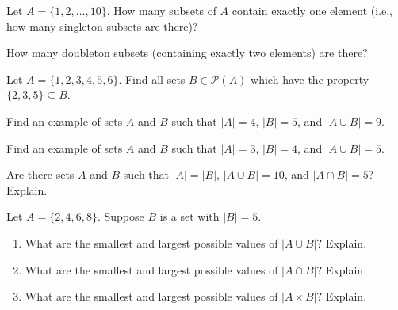\documentclass[11pt,]{book}
\theoremstyle{ptxplainnotitle}
\theoremstyle{ptxplaintitle}
\theoremstyle{ptxdefinitionnotitle}
\theoremstyle{ptxdefinitiontitle}
\theoremstyle{ptxdefinitionnotitle}
\theoremstyle{ptxdefinitiontitle}
\theoremstyle{ptxdefinitionnotitle}
\theoremstyle{ptxdefinitiontitle}
\theoremstyle{ptxdefinitiontitlenonumber}
\theoremstyle{ptxdefinitiontitlenonumber}
\numberwithin{equation}{chapter}
\newcommand{\pow}{\mathcal P}
\begin{document}
\begin{divisionexercise}{18}\hypertarget{exercise-96}{}
\hypertarget{p-947}{}%
Let \(A = \{1,2,\ldots, 10\}\text{.}\) How many subsets of \(A\) contain exactly one element (i.e., how many singleton subsets are there)?%
\par
\hypertarget{p-949}{}%
How many doubleton subsets (containing exactly two elements) are there?%
\end{divisionexercise}%
\begin{divisionexercise}{19}\hypertarget{exercise-97}{}
\hypertarget{p-952}{}%
Let \(A = \{1,2,3,4,5,6\}\). Find all sets \(B \in \pow(A)\) which have the property \(\{2,3,5\} \subseteq B\).%
\end{divisionexercise}%
\begin{divisionexercise}{20}\hypertarget{exercise-98}{}
\hypertarget{p-953}{}%
Find an example of sets \(A\) and \(B\) such that \(|A| = 4\), \(|B| = 5\), and \(|A \cup B| = 9\).%
\end{divisionexercise}%
\begin{divisionexercise}{21}\hypertarget{exercise-99}{}
\hypertarget{p-955}{}%
Find an example of sets \(A\) and \(B\) such that \(|A| = 3\), \(|B| = 4\), and \(|A \cup B| = 5\).%
\end{divisionexercise}%
\begin{divisionexercise}{22}\hypertarget{exercise-100}{}
\hypertarget{p-956}{}%
Are there sets \(A\) and \(B\) such that \(|A| = |B|\), \(|A\cup B| = 10\), and \(|A\cap B| = 5\)? Explain.%
\end{divisionexercise}%
\begin{divisionexercise}{23}\hypertarget{exercise-101}{}
\hypertarget{p-965}{}%
Let \(A = \{2, 4, 6, 8\}\text{.}\)  Suppose \(B\) is a set with \(|B| = 5\text{.}\) \leavevmode%
\begin{enumerate}[label=(\alph*)]
\item\hypertarget{li-431}{}\hypertarget{p-966}{}%
What are the smallest and largest possible values of \(|A \cup B|\text{?}\)  Explain.%
\item\hypertarget{li-432}{}\hypertarget{p-967}{}%
What are the smallest and largest possible values of \(|A \cap B|\text{?}\)  Explain.%
\item\hypertarget{li-433}{}\hypertarget{p-968}{}%
What are the smallest and largest possible values of \(|A \times B|\text{?}\)  Explain.%
\end{enumerate}
%
\end{divisionexercise}%
\end{document}
